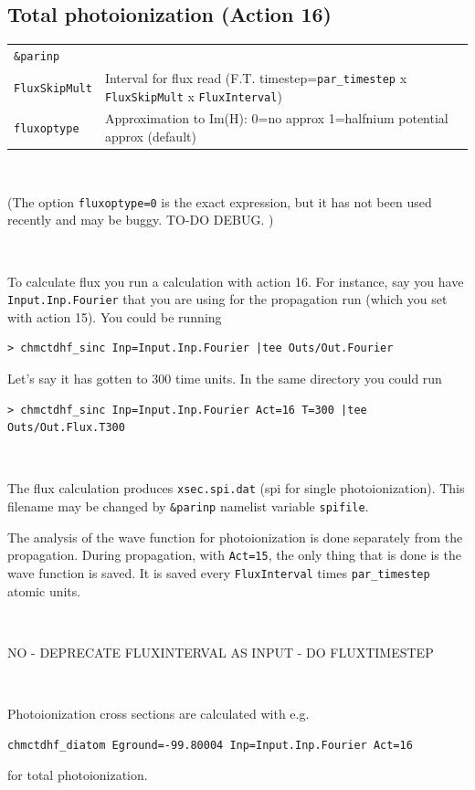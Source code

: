 \documentclass[10pt,leqno, oneside]{book}
\begin{document}
\subsection{Total photoionization (Action 16)}

{\footnotesize
\begin{tabular}{ll}
\verb#&parinp# \\
\verb#FluxSkipMult#  & Interval for flux read (F.T. timestep=\verb#par_timestep# x \verb#FluxSkipMult# x \verb#FluxInterval#) \\
\verb#fluxoptype#  & Approximation to Im(H): 0=no approx 1=halfnium potential approx (default) \\
\end{tabular}}

\

(The option \verb#fluxoptype=0# is the exact expression, but it has not been used recently and may be buggy.  TO-DO DEBUG. )

\

To calculate flux you run a calculation with action 16.  For instance, say you have \verb#Input.Inp.Fourier# that you are using for the propagation run
(which you set with action 15).  You could be running
\begin{verbatim}
> chmctdhf_sinc Inp=Input.Inp.Fourier |tee Outs/Out.Fourier
\end{verbatim}
Let's say it has gotten to 300 time units.  In the same directory you could run
\begin{verbatim}
> chmctdhf_sinc Inp=Input.Inp.Fourier Act=16 T=300 |tee Outs/Out.Flux.T300
\end{verbatim}

\

The flux calculation produces \verb#xsec.spi.dat# (spi for single photoionization).  This filename may be changed by \verb#&parinp# namelist
variable \verb#spifile#.

The analysis of the wave function for photoionization is done separately from the propagation.  During propagation, with \verb#Act=15#,
the only thing that is done is the wave function is saved.  It is saved every \verb#FluxInterval# times \verb#par_timestep# atomic units.

\

NO - DEPRECATE FLUXINTERVAL AS INPUT - DO FLUXTIMESTEP

\



Photoionization cross sections are calculated with e.g. 
\begin{verbatim}
chmctdhf_diatom Eground=-99.80004 Inp=Input.Inp.Fourier Act=16
\end{verbatim}
for total photoionization.
\end{document}
